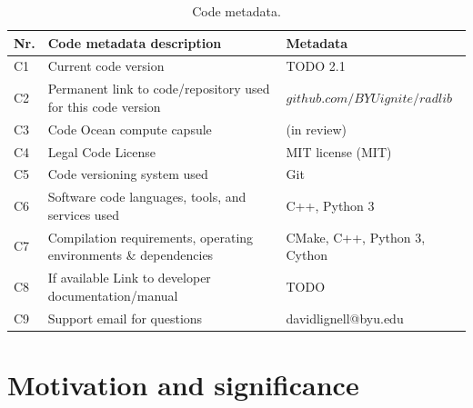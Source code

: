 \documentclass[preprint,12pt, a4paper]{elsarticle}
\begin{document}
\begin{table}[H]
\begin{tabular}{|l|p{6.5cm}|p{6.5cm}|}
\hline
\textbf{Nr.} & \textbf{Code metadata description} & \textbf{Metadata} \\
\hline
C1 & Current code version & TODO 2.1 \\
\hline
C2 & Permanent link to code/repository used for this code version & $github.com/BYUignite/radlib$ \\
\hline
C3 & Code Ocean compute capsule & (in review) \\
\hline
C4 & Legal Code License   & MIT license (MIT) \\
\hline
C5 & Code versioning system used & Git \\
\hline
C6 & Software code languages, tools, and services used & C++, Python 3 \\
\hline
C7 & Compilation requirements, operating environments \& dependencies & CMake, C++, Python 3, Cython \\
\hline
C8 & If available Link to developer documentation/manual & TODO \\
\hline
C9 & Support email for questions & davidlignell@byu.edu \\
\hline
\end{tabular}
\caption{Code metadata.}
\label{} 
\end{table}


\linenumbers



\section{Motivation and significance} \label{s:motivation}
\end{document}
